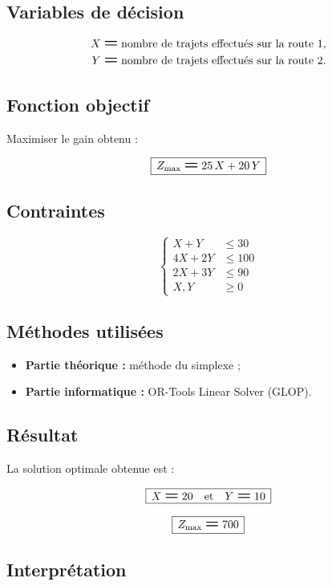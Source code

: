 \documentclass[12pt,a4paper]{article}
\newcommand{\Eq}{\mathrel{\text{\Large\bfseries =}}}
\newcommand{\Leq}{\leqslant}
\newcommand{\Geq}{\geqslant}
\newcommand{\BoxedEq}[1]{%
  \begin{equation*}
    \boxed{\,\displaystyle #1\,}
  \end{equation*}%
}
\begin{document}
\subsection{Variables de décision}

\[
\begin{aligned}
X &\Eq \text{nombre de trajets effectués sur la route 1}, \\
Y &\Eq \text{nombre de trajets effectués sur la route 2}.
\end{aligned}
\]

\subsection{Fonction objectif}

Maximiser le gain obtenu :

\BoxedEq{Z_{\mathrm{max}} \Eq 25\,X + 20\,Y}

\subsection{Contraintes}

\[
\left\{
\begin{aligned}
X + Y    &\Leq 30  \\
4X + 2Y  &\Leq 100 \\
2X + 3Y  &\Leq 90  \\
X, Y     &\Geq 0
\end{aligned}
\right.
\]

\subsection{Méthodes utilisées}
\begin{itemize}
    \item \textbf{Partie théorique :} méthode du simplexe ;
    \item \textbf{Partie informatique :} OR-Tools Linear Solver (GLOP).
\end{itemize}

\subsection{Résultat}

La solution optimale obtenue est :

\BoxedEq{X \Eq 20 \quad\text{et}\quad Y \Eq 10}

\BoxedEq{Z_{\mathrm{max}} \Eq 700}

\subsection{Interprétation}
\end{document}
